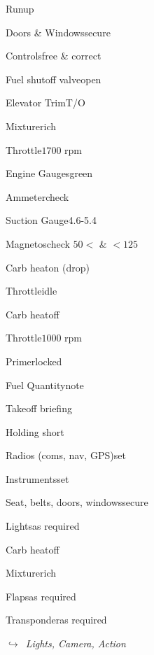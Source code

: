 \begin{multicols}{2}
\begin{checklist}{Runup}
    \item{Doors \& Windows}{secure}
    \item{Controls}{free \& correct}
    \item{Fuel shutoff valve}{open}
    \item{Elevator Trim}{T/O}
    \item{Mixture}{rich}
    \item{Throttle}{$1700$ rpm}
    \item{Engine Gauges}{green}
    \item{Ammeter}{check}
    \item{Suction Gauge}{4.6-5.4}
    \item{Magnetos}{check $50<$ \& $<125$}
    \item{Carb heat}{on (drop)}
    \item{Throttle}{idle}
    \item{Carb heat}{off}
    \item{Throttle}{$1000$ rpm}
    \item{Primer}{locked}
    \item{Fuel Quantity}{note}
\end{checklist}

\begin{checklist}{Takeoff briefing}
\end{checklist}

\begin{checklist}{Holding short}
    \item{Radios (coms, nav, GPS)}{set}
    \item{Instruments}{set}
    \item{Seat, belts, doors, windows}{secure}
    \item{Lights}{as required}
    \item{Carb heat}{off}
    \item{Mixture}{rich}
    \item{Flaps}{as required}
    \item{Transponder}{as required}
\end{checklist}

\noindent$\hookrightarrow$\ \textit{Lights, Camera, Action}

\end{multicols}

